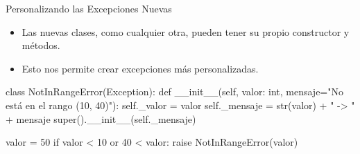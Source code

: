 \documentclass[10pt, envcountsect , spanish]{beamer}
\begin{document}
\begin{frame}[fragile]{Personalizando las Excepciones Nuevas} 

\begin{itemize}
\item Las nuevas clases, como cualquier otra, pueden tener su propio constructor y métodos.
\item Esto nos permite crear excepciones más personalizadas.
\end{itemize}
{\footnotesize
\begin{pyconsole}[][frame=single, fontsize=\scriptsize]
class NotInRangeError(Exception):
  def __init__(self, valor: int, mensaje="No está en el rango (10, 40)"):
    self._valor = valor
    self._mensaje = str(valor) + " -> " + mensaje
    super().__init__(self._mensaje)

valor = 50
if valor < 10 or 40 < valor:
  raise NotInRangeError(valor)
    
\end{pyconsole}
}


\end{frame}
\end{document}

